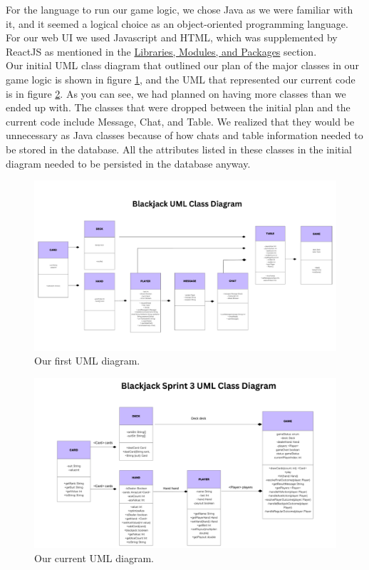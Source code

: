 \noindent For the language to run our game logic, we chose Java as we were familiar with it, and it seemed a logical choice as an object-oriented programming language. For our web UI we used Javascript and HTML, which was supplemented by ReactJS as mentioned in the \hyperref[sec:libs/mods/packs]{Libraries, Modules, and Packages} section. \\

\noindent Our initial UML class diagram that outlined our plan of the major classes in our game logic is shown in figure \ref{fig:UML}, and the UML that represented our current code is in figure \ref{fig:UML-updated}. As you can see, we had planned on having more classes than we ended up with. The classes that were dropped between the initial plan and the current code include Message, Chat, and Table. We realized that they would be unnecessary as Java classes because of how chats and table information needed to be stored in the database. All the attributes listed in these classes in the initial diagram needed to be persisted in the database anyway. \\ 

\begin{figure}[hbt!]
    \centering
    \includegraphics[width=0.8\linewidth]{figures/UML Diagram Whiteboard.pdf}
    \caption{Our first UML diagram.}
    \label{fig:UML}
\end{figure}

\begin{figure}[hbt!]
    \centering
    \includegraphics[width=0.8\linewidth]{figures/Sprint_3_UML_Diagram.png}
    \caption{Our current UML diagram.}
    \label{fig:UML-updated}
\end{figure}


